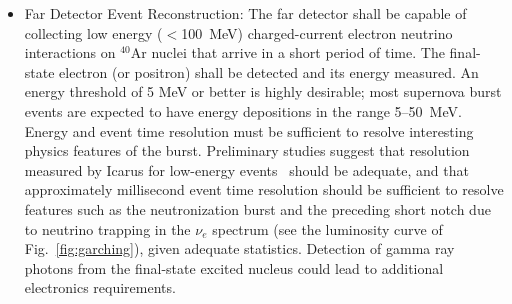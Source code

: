 \begin{itemize}
\item Far Detector Event Reconstruction:   
The far detector shall be capable of collecting low energy ($<$\SI{100}{\MeV})  charged-current electron neutrino interactions on $^{40}$Ar nuclei that arrive in a short period of time. The final-state electron (or positron) shall be detected and its energy measured.   An energy threshold of 5 MeV or better is highly desirable; most supernova burst events are expected to have energy depositions in the range 5--50~MeV.
Energy and event time resolution must be sufficient to resolve interesting physics features of the burst.  Preliminary studies suggest that resolution measured by Icarus for low-energy events~\cite{Amoruso:2003sw} should be adequate, and that approximately millisecond event time resolution should be sufficient to resolve features such as the neutronization burst and the preceding short notch due to neutrino trapping in the $\nu_e$ spectrum (see the luminosity curve of Fig.~\ref{fig:garching}), given adequate statistics.   
Detection of gamma ray photons from the final-state excited nucleus could lead to additional electronics requirements.  

\end{itemize}


